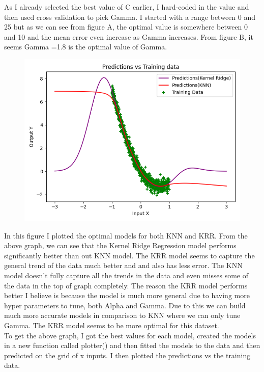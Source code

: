 \documentclass[11pt]{article} %
\begin{document}
As I already selected the best value of C earlier, I hard-coded in the value and then used cross validation to pick Gamma. I started with a range between 0 and 25 but as we can see from figure A, the optimal value is somewhere between 0 and 10 and the mean error even increase as Gamma increases. From figure B, it seems Gamma =1.8 is the optimal value of Gamma.
\clearpage
\begin{figure}[h]
\centering
\includegraphics[scale=0.7]{knvkr.png}
\end{figure}
In this figure I plotted the optimal models for both KNN and KRR. From the above graph, we can see that the Kernel Ridge Regression model performs significantly better than out KNN model. The KRR model seems to capture the general trend of the data much better and and also has less error. The KNN model doesn't fully capture all the trends in the data and even misses some of the data in the top of graph completely. The reason the KRR model performs better I believe is because the model is much more general due to having more hyper parameters to tune, both Alpha and Gamma. Due to this we can build much more accurate models in comparison to KNN where we can only tune Gamma. The KRR model seems to be more optimal for this dataset.\\ To get the above graph, I got the best values for each model, created the models in a new function called plotter() and then fitted the models to the data and then predicted on the grid of x inputs. I then plotted the predictions vs the training data.
\end{document}
